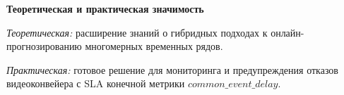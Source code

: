 \textbf{Теоретическая и практическая значимость}

\hspace*{1.25cm}\textit{Теоретическая:} расширение знаний о гибридных подходах к онлайн-прогнозированию многомерных временных рядов.

\hspace*{1.25cm}\textit{Практическая:} готовое решение для мониторинга и предупреждения отказов видеоконвейера с SLA конечной метрики $common\_event\_delay$.
